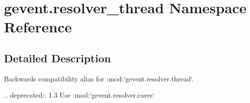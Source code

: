\hypertarget{namespacegevent_1_1resolver__thread}{}\section{gevent.\+resolver\+\_\+thread Namespace Reference}
\label{namespacegevent_1_1resolver__thread}


\subsection{Detailed Description}
\begin{DoxyVerb}Backwards compatibility alias for :mod:`gevent.resolver.thread`.

.. deprecated:: 1.3
   Use :mod:`gevent.resolver.cares`
\end{DoxyVerb}
 